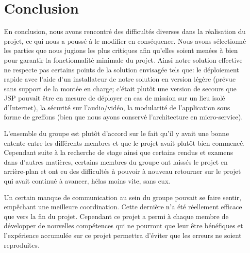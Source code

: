 \chapter{Conclusion}

En conclusion, nous avons rencontré des difficultés diverses dans la
réalisation du projet, ce qui nous a poussé à le modifier en conséquence.
Nous avons sélectionné les parties que nous jugions les plus critiques
afin qu’elles soient menées à bien pour garantir la fonctionnalité minimale
du projet. Ainsi notre solution effective ne respecte pas certains points
de la solution envisagée tels que: le déploiement rapide avec l’aide d’un
installateur de notre solution en version légère (prévue sans support de
la montée en charge; c’était plutôt une version de secours que JSP pouvait
être en mesure de déployer en cas de mission sur un lieu isolé d’Internet),
la sécurité sur l’audio/vidéo, la modularité de l’application sous forme de
greffons (bien que nous ayons conservé l’architecture en micro-service).

L’ensemble du groupe est plutôt d’accord sur le fait qu’il y avait une bonne
entente entre les différents membres et que le projet avait plutôt bien
commencé. Cependant suite à la recherche de stage ainsi que certains rendus
et examens dans d’autres matières, certains membres du groupe ont laissés le
projet en arrière-plan et ont eu des difficultés à pouvoir à nouveau retourner
sur le projet qui avait continué à avancer, hélas moins vite, sans eux.

Un certain manque de communication au sein du groupe pouvait se faire sentir,
empêchant une meilleure coordination. Cette dernière n’a été réellement
efficace que vers la fin du projet. Cependant ce projet a permi à chaque
membre de développer de nouvelles compétences qui ne pourront que leur être
bénéfiques et l’expérience accumulée sur ce projet permettra d’éviter que les
erreurs ne soient reproduites.

